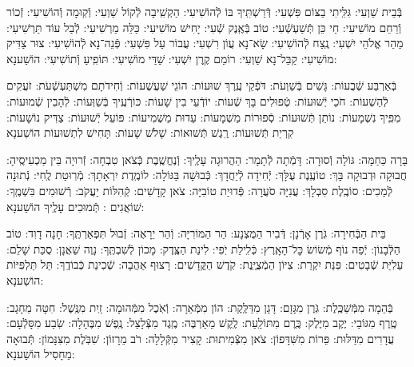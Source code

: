 \documentclass[twoside, openany, parskip=half, 11pt]{book}
\begin{document}
בְּֿבֵית שַׁוְעִי: גִּלִּֽיתִי בַצּוֹם פִּשְׁעִי: דְּֿרַשְׁתִּֽיךָ בּוֹ לְֿהוֹשִׁיעִי: הַקְשִֽׁיבָה לְֿקוֹל שַׁוְעִי: וְֿקֽוּמָה וְֿהוֹשִׁיעִי: זְֿכוֹר וְֿרַחֵם מוֹשִׁיעִי: חַי כֵּן תְּֿשַׁעְשְֿׁעִי: טוֹב בְּֿאֶֽנֶק שְֿׁעִי: יָחִישׁ מוֹשִׁיעִי: כַּלֵּה מַרְשִׁיעִי: לְֿבַל עוֹד תַּרְשִׁיעִי: מַהֵר אֱלֹהֵי יִשְׁעִי: נֶֽצַח לְֿהוֹשִׁיעִי: שָׂא־נָא עֲוֹן רִשְׁעִי: עֲבוֹר עַל פִּשְׁעִי: פְּֿנֵה־נָא לְֿהוֹשִׁיעִי: צוּר צַדִּיק מוֹשִׁיעִי: קַבֵּל־נָא שַׁוְעִי: רוֹמֵם קֶֽרֶן יִשְׁעִי:
שַׁדַּי מוֹשִׁיעִי: תּוֹפִֽיעַ וְֿתוֹשִׁיעִי: הוֹשַׁענָא:


בְּֿאַרְבַּע שְֿׁבֻעוֹת: גָּשִׁים בְּֿשַׁוְעֹת: דֹּפְֿקֵי עֶֽרֶךְ שׁוּעוֹת: הוֹגֵי שַׁעֲשֻׁעוֹת: וְֿחִידֹתָם מִשְׁתַּעְשְֿׁעֹת: זֹעֲקִים לְֿהַשְׁעוֹת: חֹכֵי יְֿשׁוּעוֹת: טְֿפוּלִים בָּךְ שְֿׁעוֹת: יוֹדְֿעֵי בִין שָׁעוֹת: כּוֹרְֿעֶֽיךָ בְּֿשַׁוְּעוֹת: לְֿהָבִין שְֿׁמוּעוֹת: מִפִּֽיךָ נִשְׁמָעוֹת: נוֹתֵן תְּֿשׁוּעוֹת: סְֿפוּרוֹת מַשְׁמָעוֹת: עֵדוּת מַשְׁמִיעוֹת: פּוֹעֵל יְֿשׁוּעוֹת: צַדִּיק נוֹשָׁעוֹת: קִרְיַת תְּֿשׁוּעוֹת: רֶֽגֶשׁ תְּֿשׁוּאוֹת:
שָׁלֹשׁ שָׁעוֹת:
תָּחִישׁ לִתְשׁוּעוֹת הוֹשַׁענָא



בָּרָה כַּחַמָּה: גּוֹלָה וְֿסוּרָה: דָּמְֿתָה לְֿתָמָר: הַהֲרוּגָה עָלֶֽיךָ: וְֿנֶחֱשֶֽׁבֶת כְּֿצֹאן טִבְחָה: זְֿרוּיָה בֵּין מַכְעִיסֶֽיהָ: חֲבוּקָה וּדְבוּקָה בָּךְ: טוֹעֶֽנֶת עֻלָּךְ: יְֿחִידָה לְֿיַחֲדָךְ: כְּֿבוּשָׁה בַּגּוֹלָה: לוֹמֶֽדֶת יִרְאָתָךְ: מְֿרֽוּטַת לֶֽחִי: נְֿתוּנָה לְֿמַכִים: סוֹבֶֽלֶת סִבְלָךְ: עֲנִיָּה סֹעֲרָה: פְּֿדוּיַת טוֹבִיָּה: צֹאן קָדָשִׁים: קְֿהִלּוֹת יַעֲקֹב: רְֿשׁוּמִים בִּשְׁמֶֽךָ:
שׁוֹאֲגִים :
תְּֿמוּכִים עָלֶֽיךָ הוֹשַׁענָא:


בֵּית הַבְּֿחִירָה: גֹּֽרֶן אָרְֿנָן: דְּֿבִיר הַמֻּצְנָע: הַר הַמּוֹרִיָּה: וְֿהַר יֵרָאֶה: זְֿבוּל תִּפְאַרְתֶּֽךָ: חָנָה דָוִד: טוֹב הַלְּֿבָנוֹן: יְֿפֵה נוֹף מְֿשׂוֹשׂ כׇּל־הָאָֽרֶץ: כְּֿלִֽילַת יֹֽפִי: לִינַת הַצֶּֽדֶק: מָכוֹן לְֿשִׁבְתֶּֽךָ: נָוֶה שַׁאֲנָן: סֻכַּת שָׁלֵם: עַלִיַּת שְֿׁבָטִים: פִּנַּת יִקְרַת: צִיּוֹן הַמְֿצֻיֶּֽנֶת: קֹֽדֶשׁ הַקֳּדָשִׁים: רָצוּף אַהֲבָה:
שְֿׁכִינַת כְּֿבוֹדֶֽךָ:
תֵּל תַּלְפִּיּוֹת הוֹשַׁענָא:


בְּֿהֵמָה מִמְּֿשַׁכֶּֽלֶת: גֹּֽרֶן מִגָּזָם: דָּגָן מִדַּלֶּֽקֶת: הוֹן מִמְּֿאֵרָה: וְֿאֹֽכֶל מִמְּֿהוּמָה: זַֽיִת מִנֶּֽשֶׁל: חִטָּה מֵחָגָב: טֶֽרֶף מִגּוֹבַי: יֶקֶב מִיֶּלֶק: כֶּֽרֶם מִתּוֹלַֽעַת: לֶֽקֶשׁ מֵאַרְבֶּה: מֶֽגֶד מִצְּֿלָצַל: נֶֽפֶשׁ מִבֶּהָלָה: שֽׂבַע מִסָּלְֿעָם: עֲדָרִים מִדַּלּוּת: פֵּרוֹת מִשִּׁדָּפוֹן: צֹאן מִצְּֿמִיתוּת: קָצִיר מִקְּֿלָלָה: רֹב מֵרָזוֹן:
שִׁבֹּֽלֶת מִצִּנָּמוֹן:
תְּֿבוּאָה מֵחָסִיל הוֹשַׁענָא:
\end{document}
